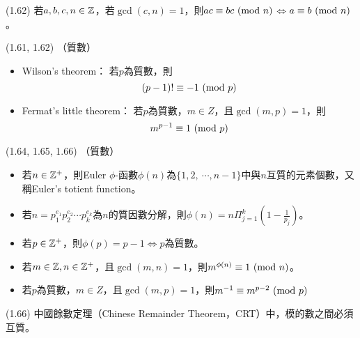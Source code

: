 \item \begin{theorem}{(1.62)} 若$a, b, c, n \in \mathbb{Z}$，若$\gcd(c, n) = 1$，則$ac \equiv bc \ (\mathrm{mod}\ n)$$\iff$$a \equiv b \ (\mathrm{mod}\ n)$。
\end{theorem}

\item \begin{theorem}{(1.61, 1.62)} （質數）
    \begin{itemize}
        \item Wilson's theorem：
        若$p$為質數，則
        \begin{equation}
            (p - 1)! \equiv -1 \ (\mathrm{mod}\ p)
        \end{equation}
        \item Fermat's little theorem：
        若$p$為質數，$m \in Z$，且$\gcd(m, p) = 1$，則
        \begin{equation}
            m^{p - 1} \equiv 1 \ (\mathrm{mod}\ p)
        \end{equation}
    \end{itemize}
\end{theorem}

\item \begin{theorem}{(1.64, 1.65, 1.66)} （質數）
    \begin{itemize}
        \item 若$n \in \mathbb{Z}^+$，則Euler $\phi$-函數$\phi(n)$為$\{1, 2, \ \cdots, n - 1\}$中與$n$互質的元素個數，又稱Euler's totient function。
        \item 若$n = p_1^{e_1}p_2^{e_2}\cdots p_k^{e_k}$為$n$的質因數分解，則$\phi(n) = n\Pi_{j = 1}^{k}(1 - \frac{1}{p_j})$。
        \item 若$p \in \mathbb{Z}^+$，則$\phi(p) = p - 1$$\iff$$p$為質數。
        \item 若$m \in \mathbb{Z}, n \in \mathbb{Z}^+$，且$\gcd(m, n) = 1$，則$m^{\phi(n)} \equiv 1 \ (\mathrm{mod}\ n)$。
        \item 若$p$為質數，$m \in Z$，且$\gcd(m, p) = 1$，則$m^{-1} \equiv m^{p - 2} \ (\mathrm{mod}\ p)$
    \end{itemize}
\end{theorem}

\item \begin{theorem}{(1.66)} 中國餘數定理（Chinese Remainder Theorem，CRT）中，模的數之間必須互質。
\end{theorem}
